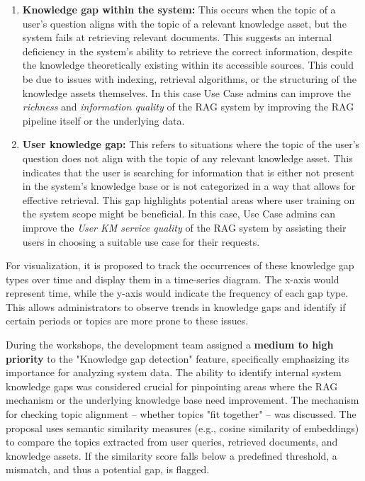 \documentclass[
	english,
	ruledheaders=section,%
	class=report,%
	thesis={type=bachelor},%
	accentcolor=1b,%
	custommargins=true,%
	marginpar=false,%
	parskip=half-,%
	fontsize=11pt,%
	DIV=14,
]{tudapub}
\begin{document}
\begin{enumerate}
    \item \textbf{Knowledge gap within the system:} This occurs when the topic of a user's question aligns with the topic of a relevant knowledge asset, but the system fails at retrieving relevant documents. This suggests an internal deficiency in the system's ability to retrieve the correct information, despite the knowledge theoretically existing within its accessible sources. This could be due to issues with indexing, retrieval algorithms, or the structuring of the knowledge assets themselves. In this case Use Case admins can improve the \textit{richness} and \textit{information quality} \parencite[pp.~57--58]{DeloneMcLean2003ISSuccessTenYearUpdate} of the RAG system by improving the RAG pipeline itself or the underlying data.
    \item \textbf{User knowledge gap:} This refers to situations where the topic of the user's question does not align with the topic of any relevant knowledge asset. This indicates that the user is searching for information that is either not present in the system's knowledge base or is not categorized in a way that allows for effective retrieval. This gap highlights potential areas where user training on the system scope might be beneficial. In this case, Use Case admins can improve the \textit{User KM service quality} \parencite[pp.~58--59]{DeloneMcLean2003ISSuccessTenYearUpdate} of the RAG system by assisting their users in choosing a suitable use case for their requests.
\end{enumerate}

For visualization, it is proposed to track the occurrences of these knowledge gap types over time and display them in a time-series diagram. The x-axis would represent time, while the y-axis would indicate the frequency of each gap type. This allows administrators to observe trends in knowledge gaps and identify if certain periods or topics are more prone to these issues.

During the workshops, the development team assigned a \textbf{medium to high priority} to the "Knowledge gap detection" feature, specifically emphasizing its importance for analyzing system data. The ability to identify internal system knowledge gaps was considered crucial for pinpointing areas where the RAG mechanism or the underlying knowledge base need improvement. The mechanism for checking topic alignment -- whether topics "fit together" -- was discussed. The proposal uses semantic similarity measures (e.g., cosine similarity of embeddings) to compare the topics extracted from user queries, retrieved documents, and knowledge assets. If the similarity score falls below a predefined threshold, a mismatch, and thus a potential gap, is flagged.
\end{document}
